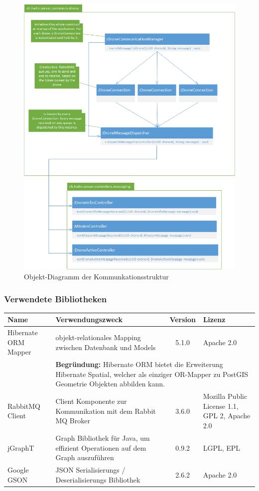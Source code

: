 \begin{figure}[H]
	\centering
	\includegraphics[width=0.8\paperwidth] {images/drone-communication-diagram.png}
	\caption{Objekt-Diagramm der Kommunkationsstruktur}
	\label{fig:drone-communication-diagram}
\end{figure}

\subsubsection{Verwendete Bibliotheken}

\begin{tabularx}{\textwidth}{|X|X|c|X|}
	\hline
	\textbf{Name} & \textbf{Verwendungszweck} & \textbf{Version} & \textbf{Lizenz} \\
	\hline \hline
	Hibernate ORM Mapper & objekt-relationales Mapping zwischen Datenbank und Models  & 5.1.0 & Apache 2.0\\
	\cmidrule{2-4}
	& \multicolumn{3}{l|}{\textbf{Begründung:} Hibernate ORM bietet die Erweiterung Hibernate Spatial, welcher als einziger OR-Mapper zu PostGIS Geometrie Objekten abbilden kann. }
	\\
	\hline 
	RabbitMQ Client & Client Komponente zur Kommunikation mit dem Rabbit MQ Broker & 3.6.0 &  Mozilla Public License 1.1, GPL 2, Apache 2.0 \\
	\hline 
	jGraphT & Graph Bibliothek für Java, um effizient Operationen auf dem Graph auszuführen & 0.9.2 &  LGPL, EPL \\
	\hline 
	Google GSON & JSON Serialisierungs / Deserialisierungs Bibliothek & 2.6.2 & Apache 2.0\\
	\hline 
\end{tabularx}

